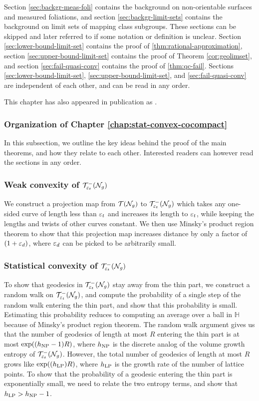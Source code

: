Section \ref{sec:backgr-meas-foli} contains the background on non-orientable surfaces and measured foliations, and section \ref{sec:backgr-limit-sets} contains the background on limit sets of mapping class subgroups.
These sections can be skipped and later referred to if some notation or definition is unclear.
Section \ref{sec:lower-bound-limit-set} contains the proof of \autoref{thm:rational-approximation}, section \ref{sec:upper-bound-limit-set} contains the proof of Theorem \ref{cor:geolimset}, and section \ref{sec:fail-quasi-conv} contains the proof of \autoref{thm:qc-fail}.
Sections \ref{sec:lower-bound-limit-set}, \ref{sec:upper-bound-limit-set}, and \ref{sec:fail-quasi-conv} are independent of each other, and can be read in any order.

This chapter has also appeared in publication as \cite{limitsetkhan}.

\subsubsection*{Organization of Chapter \ref{chap:stat-convex-cocompact}}

In this subsection, we outline the key ideas behind the proof of the main theorems, and how they relate to each other.
Interested readers can however read the sections in any order.

\subsubsection*{Weak convexity of $\mathcal{T}_{\varepsilon_t}^{-}(\mathcal{N}_g)$}
We construct a projection map from $\mathcal{T}(\mathcal{N}_g)$ to $\mathcal{T}_{\varepsilon_t}^{-}(\mathcal{N}_g)$ which takes any one-sided curve of length less than $\varepsilon_t$ and increases its length to $\varepsilon_t$, while keeping the lengths and twists of other curves constant.
We then use Minsky's product region theorem to show that this projection map increases distance by only a factor of $(1 + \varepsilon_d)$, where $\varepsilon_d$ can be picked to be arbitrarily small.

\subsubsection*{Statistical convexity of $\mathcal{T}_{\varepsilon_t}^{-}(\mathcal{N}_g)$}
To show that geodesics in $\mathcal{T}_{\varepsilon_t}^{-}(\mathcal{N}_g)$ stay away from the thin part, we construct a random walk on $\mathcal{T}_{\varepsilon_t}^{-}(\mathcal{N}_g)$, and compute the probability of a single step of the random walk entering the thin part, and show that this probability is small.
Estimating this probability reduces to computing an average over a ball in $\mathbb{H}$ because of Minsky's product region theorem.
The random walk argument gives us that the number of geodesics of length at most $R$ entering the thin part is at most $\exp((h_{\mathrm{NP}} - 1)R)$, where $h_{\mathrm{NP}}$ is the discrete analog of the volume growth entropy of $\mathcal{T}_{\varepsilon_t}^{-}(\mathcal{N}_g)$.
However, the total number of geodesics of length at most $R$ grows like $\exp((h_{\mathrm{LP}})R)$, where $h_{\mathrm{LP}}$ is the growth rate of the number of lattice points.
To show that the probability of a geodesic entering the thin part is exponentially small, we need to relate the two entropy terms, and show that $h_{\mathrm{LP}} > h_{\mathrm{NP}} - 1$.

